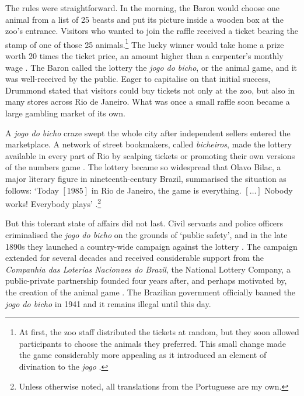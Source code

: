 \documentclass[a4paper,12pt]{article}
\begin{document}
The rules were straightforward. In the morning, the Baron would choose one animal from a list of 25 beasts and put its picture inside a wooden box at the zoo's entrance. Visitors who wanted to join the raffle received a ticket bearing the stamp of one of those 25 animals.\footnote{At first, the zoo staff distributed the tickets at random, but they soon allowed participants to choose the animals they preferred. This small change made the game considerably more appealing as it introduced an element of divination to the \textit{jogo} \citep[71--74]{da1999aguias}.} The lucky winner would take home a prize worth 20 times the ticket price, an amount higher than a carpenter's monthly wage \citep[542]{chazkel2007beyond}. The Baron called the lottery the \textit{jogo do bicho}, or the animal game, and it was well-received by the public. Eager to capitalise on that initial success, Drummond stated that visitors could buy tickets not only at the zoo, but also in many stores across Rio de Janeiro. What was once a small raffle soon became a large gambling market of its own. 

A \textit{jogo do bicho} craze swept the whole city after independent sellers entered the marketplace. A network of street bookmakers, called \textit{bicheiros}, made the lottery available in every part of Rio by scalping tickets or promoting their own versions of the numbers game \citep[37]{chazkel2011laws}. The lottery became so widespread that Olavo Bilac, a major literary figure in nineteenth-century Brazil, summarised the situation as follows: `Today $[1985]$ in Rio de Janeiro, the game is everything. $[\dots]$  Nobody works! Everybody plays' \citep[43]{pacheco1957antologia}.\footnote{Unless otherwise noted, all translations from the Portuguese are my own.} 

But this tolerant state of affairs did not last. Civil servants and police officers criminalised the \textit{jogo do bicho} on the grounds of `public safety', and in the late 1890s they launched a country-wide campaign against the lottery \citep{benatte2002jogos}. The campaign extended for several decades and received considerable support from the \textit{Companhia das Loterias Nacionaes do Brazil}, the National Lottery Company, a public-private partnership founded four years after, and perhaps motivated by, the creation of the animal game \citep[82]{da1999aguias}. The Brazilian government officially banned the \textit{jogo do bicho} in 1941 and it remains illegal until this day.  
 
\end{document}
